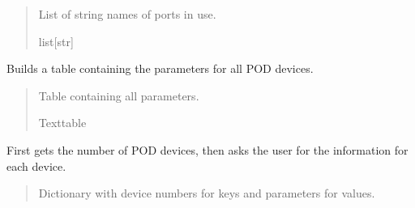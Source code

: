 \documentclass[letterpaper,10pt,english]{sphinxmanual}
\begin{document}
\begin{fulllineitems}
\begin{fulllineitems}
\begin{quote}
\begin{description}
\sphinxAtStartPar
List of string names of ports in use.

\sphinxAtStartPar
list{[}str{]}

\end{description}\end{quote}

\end{fulllineitems}


\begin{fulllineitems}
\label{\detokenize{Setup.SetupOneDevice:Setup.SetupOneDevice.Setup_PodInterface.SetupInterface._GetPODdeviceParameterTable}}
\pysigstartsignatures
{}
\pysigstopsignatures
\sphinxAtStartPar
Builds a table containing the parameters for all POD devices.
\begin{quote}\begin{description}
\sphinxAtStartPar
Table containing all parameters.

\sphinxAtStartPar
Texttable

\end{description}\end{quote}

\end{fulllineitems}


\begin{fulllineitems}
\label{\detokenize{Setup.SetupOneDevice:Setup.SetupOneDevice.Setup_PodInterface.SetupInterface._GetParam_allPODdevices}}
\pysigstartsignatures
{}
\pysigstopsignatures
\sphinxAtStartPar
First gets the number of POD devices, then asks the user for the information         for each device.
\begin{quote}\begin{description}
\sphinxAtStartPar
Dictionary with device numbers for keys and parameters for values.


\end{description}
\end{quote}
\end{fulllineitems}
\end{fulllineitems}
\end{document}
